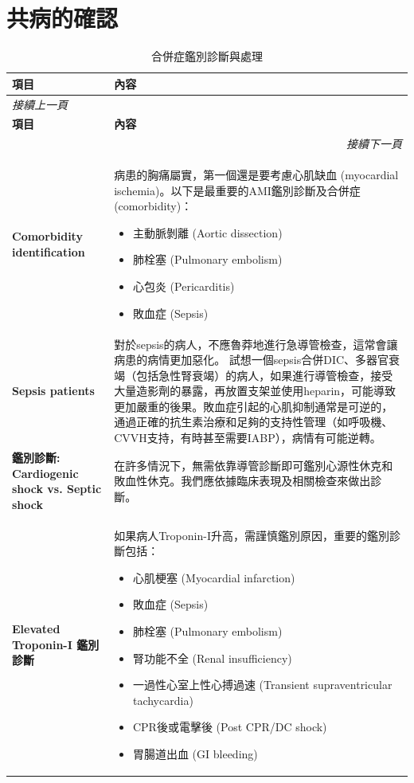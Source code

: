 \documentclass[fleqn,10pt,
paperheight=16cm, paperwidth=12cm,
includehead,%
nomarginpar,%
textwidth=10cm,%
headheight=25pt,%
]{wlscirep}
\begin{document}
\section{共病的確認}
\begin{longtable}{p{4cm} p{9cm}}
\caption{合併症鑑別診斷與處理}\\
\hline
\textbf{項目} & \textbf{內容} \\
\hline
\endfirsthead
\multicolumn{2}{l}{\textit{接續上一頁}} \\
\hline
\textbf{項目} & \textbf{內容} \\
\hline
\endhead
\hline \multicolumn{2}{r}{\textit{接續下一頁}} \\
\endfoot
\endlastfoot

\textbf{Comorbidity identification} & 
病患的胸痛屬實，第一個還是要考慮心肌缺血 (myocardial ischemia)。以下是最重要的AMI鑑別診斷及合併症 (comorbidity)：
\begin{itemize}
    \item 主動脈剝離 (Aortic dissection)
    \item 肺栓塞 (Pulmonary embolism)
    \item 心包炎 (Pericarditis)
    \item 敗血症 (Sepsis)
\end{itemize} \\ \hline

\textbf{Sepsis patients} & 
對於sepsis的病人，不應魯莽地進行急導管檢查，這常會讓病患的病情更加惡化。 
試想一個sepsis合併DIC、多器官衰竭（包括急性腎衰竭）的病人，如果進行導管檢查，接受大量造影劑的暴露，再放置支架並使用heparin，可能導致更加嚴重的後果。敗血症引起的心肌抑制通常是可逆的，通過正確的抗生素治療和足夠的支持性管理（如呼吸機、CVVH支持，有時甚至需要IABP），病情有可能逆轉。\\ \hline

\textbf{鑑別診斷: Cardiogenic shock vs. Septic shock} & 
在許多情況下，無需依靠導管診斷即可鑑別心源性休克和敗血性休克。我們應依據臨床表現及相關檢查來做出診斷。\\ \hline

\textbf{Elevated Troponin-I 鑑別診斷} & 
如果病人Troponin-I升高，需謹慎鑑別原因，重要的鑑別診斷包括：
\begin{itemize}
    \item 心肌梗塞 (Myocardial infarction)
    \item 敗血症 (Sepsis)
    \item 肺栓塞 (Pulmonary embolism)
    \item 腎功能不全 (Renal insufficiency)
    \item 一過性心室上性心搏過速 (Transient supraventricular tachycardia)
    \item CPR後或電擊後 (Post CPR/DC shock)
    \item 胃腸道出血 (GI bleeding)
\end{itemize} 
\\ \hline


\end{longtable}
\end{document}
